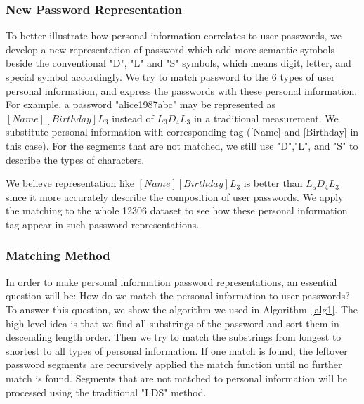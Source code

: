 \documentclass{sig-alternate}
\begin{document}
\subsubsection{New Password Representation}
To better illustrate how personal information correlates to user passwords, we develop a new representation of password which add more semantic symbols beside the conventional "D", "L" and "S" symbols, which means digit, letter, and special symbol accordingly. We try to match password to the 6 types of user personal information, and express the passwords with these personal information. For example, a password "alice1987abc" may be represented as $[Name][Birthday]L_3$ instead of $L_3D_4L_3$ in a traditional measurement. We substitute personal information with corresponding tag ([Name] and [Birthday] in this case). For the segments that are not matched, we still use "D","L", and "S" to describe the types of characters.

We believe representation like $[Name][Birthday]L_3$ is better than $L_5D_4L_3$ since it more accurately describe the composition of user passwords. We apply the matching to the whole 12306 dataset to see how these personal information tag appear in such password representations.

\subsubsection{Matching Method}
\label{matchingmethod}
In order to make personal information password representations, an essential question will be: How do we match the personal information to user passwords? To answer this question, we show the algorithm we used in Algorithm~\ref{alg1}. The high level idea is that we find all substrings of the password and sort them in descending length order. Then we try to match the substrings from longest to shortest to all types of personal information. If one match is found, the leftover password segments are recursively applied the match function until no further match is found. Segments that are not matched to personal information will be processed using the traditional "LDS" method.
\end{document}

